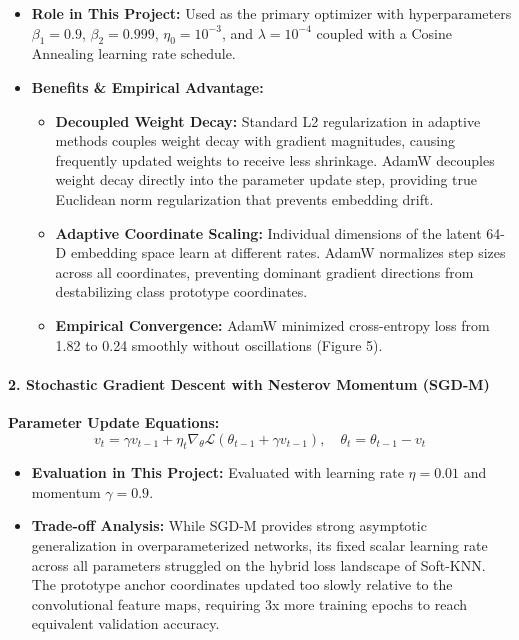 \begin{itemize}
\tightlist
\item
  \textbf{Role in This Project:} Used as the primary optimizer with
  hyperparameters \(\beta_1 = 0.9\), \(\beta_2 = 0.999\),
  \(\eta_0 = 10^{-3}\), and \(\lambda = 10^{-4}\) coupled with a Cosine
  Annealing learning rate schedule.
\item
  \textbf{Benefits \& Empirical Advantage:}

  \begin{itemize}
  \tightlist
  \item
    \textbf{Decoupled Weight Decay:} Standard L2 regularization in
    adaptive methods couples weight decay with gradient magnitudes,
    causing frequently updated weights to receive less shrinkage. AdamW
    decouples weight decay directly into the parameter update step,
    providing true Euclidean norm regularization that prevents embedding
    drift.
  \item
    \textbf{Adaptive Coordinate Scaling:} Individual dimensions of the
    latent 64-D embedding space learn at different rates. AdamW
    normalizes step sizes across all coordinates, preventing dominant
    gradient directions from destabilizing class prototype coordinates.
  \item
    \textbf{Empirical Convergence:} AdamW minimized cross-entropy loss
    from 1.82 to 0.24 smoothly without oscillations (Figure 5).
  \end{itemize}
\end{itemize}

\paragraph{2. Stochastic Gradient Descent with Nesterov Momentum
(SGD-M)}\label{2-stochastic-gradient-descent-with-nesterov-momentum-sgd-m}

\textbf{Parameter Update Equations:} \[
v_t = \gamma v_{t-1} + \eta_t \nabla_\theta \mathcal{L}(\theta_{t-1} + \gamma v_{t-1}), \quad \theta_t = \theta_{t-1} - v_t
\]

\begin{itemize}
\tightlist
\item
  \textbf{Evaluation in This Project:} Evaluated with learning rate
  \(\eta = 0.01\) and momentum \(\gamma = 0.9\).
\item
  \textbf{Trade-off Analysis:} While SGD-M provides strong asymptotic
  generalization in overparameterized networks, its fixed scalar
  learning rate across all parameters struggled on the hybrid loss
  landscape of Soft-KNN. The prototype anchor coordinates updated too
  slowly relative to the convolutional feature maps, requiring 3x more
  training epochs to reach equivalent validation accuracy.
\end{itemize}

